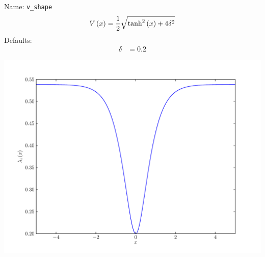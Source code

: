\documentclass[a4paper,10pt]{report}
\begin{document}
\begin{minipage}{0.5\linewidth}
  Name:    \texttt{v\_shape}
  \begin{equation*}
    V\left( x \right) = \frac{1}{2} \sqrt{\operatorname{tanh}^{2}\left(x\right) + 4 \delta^{2}}
  \end{equation*}
  Defaults:
  \begin{align*}
    \delta & = 0.2
  \end{align*}
\end{minipage}
\begin{minipage}{0.5\linewidth}
  \begin{center}
    \includegraphics[scale=0.25]{./fig/v_shape.pdf}
  \end{center}
\end{minipage}
\end{document}

